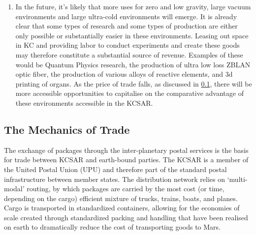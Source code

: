 \documentclass[fleqn,10pt]{Stylesheet} %
\begin{document}
\begin{enumerate}
\item In the future, it’s likely that more uses for zero and low gravity, large  vacuum environments and large ultra-cold environments will emerge. It is already clear that some types of research and some types of production are either only possible or substantially easier in these environments. Leasing out space in KC and providing labor to conduct experiments and create these goods may therefore constitute a substantial source of revenue. Examples of these would be Quantum Physics research, the production of ultra low loss ZBLAN optic fiber\cite{Ingo2018}, the production of various alloys of reactive elements\cite{Russel2019}, and 3d printing of organs\cite{Boissonneault2019}.  As the price of trade falls, as discussed in \ref{sec:mechanics_trade}, there will be more accessible opportunities to capitalise on the comparative advantage of these environments accessible in the KCSAR.
\end{enumerate}

\subsection{The Mechanics of Trade}
\label{sec:mechanics_trade}
The exchange of packages through the inter-planetary postal services is the basis for trade between KCSAR and earth-bound parties. The KCSAR is a member of the United Postal Union (UPU) and therefore part of the standard postal infrastructure between member states. The distribution network relies on ‘multi-modal’ routing, by which packages are carried by the most cost (or time, depending on the cargo) efficient mixture of trucks, trains, boats, and planes. Cargo is transported in standardized containers, allowing for the economies of scale created through standardized packing and handling that have been realised on earth to dramatically reduce the cost of transporting goods to Mars. \cite{Levinson}
\end{document}
